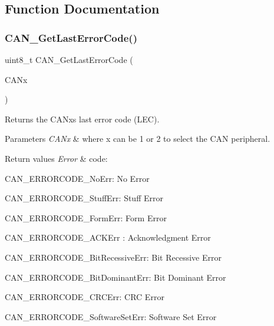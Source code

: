 \subsection{Function Documentation}
\mbox{\label{group__CAN__Group5_gaaee721a392b6b21bfd15dc160aeb6924}} 
\subsubsection{C\+A\+N\+\_\+\+Get\+Last\+Error\+Code()}
{\footnotesize\ttfamily uint8\+\_\+t C\+A\+N\+\_\+\+Get\+Last\+Error\+Code (\begin{DoxyParamCaption}\item[{\textbf{ C\+A\+N\+\_\+\+Type\+Def} $\ast$}]{C\+A\+Nx }\end{DoxyParamCaption})}



Returns the C\+A\+Nx\textquotesingle{}s last error code (L\+EC). 


\begin{DoxyParams}{Parameters}
{\em C\+A\+Nx} & where x can be 1 or 2 to select the C\+AN peripheral. \\
\hline
\end{DoxyParams}

\begin{DoxyRetVals}{Return values}
{\em Error} & code\+:
\begin{DoxyItemize}
\item C\+A\+N\+\_\+\+E\+R\+R\+O\+R\+C\+O\+D\+E\+\_\+\+No\+Err\+: No Error
\item C\+A\+N\+\_\+\+E\+R\+R\+O\+R\+C\+O\+D\+E\+\_\+\+Stuff\+Err\+: Stuff Error
\item C\+A\+N\+\_\+\+E\+R\+R\+O\+R\+C\+O\+D\+E\+\_\+\+Form\+Err\+: Form Error
\item C\+A\+N\+\_\+\+E\+R\+R\+O\+R\+C\+O\+D\+E\+\_\+\+A\+C\+K\+Err \+: Acknowledgment Error
\item C\+A\+N\+\_\+\+E\+R\+R\+O\+R\+C\+O\+D\+E\+\_\+\+Bit\+Recessive\+Err\+: Bit Recessive Error
\item C\+A\+N\+\_\+\+E\+R\+R\+O\+R\+C\+O\+D\+E\+\_\+\+Bit\+Dominant\+Err\+: Bit Dominant Error
\item C\+A\+N\+\_\+\+E\+R\+R\+O\+R\+C\+O\+D\+E\+\_\+\+C\+R\+C\+Err\+: C\+RC Error
\item C\+A\+N\+\_\+\+E\+R\+R\+O\+R\+C\+O\+D\+E\+\_\+\+Software\+Set\+Err\+: Software Set Error 
\end{DoxyItemize}\\
\hline
\end{DoxyRetVals}


